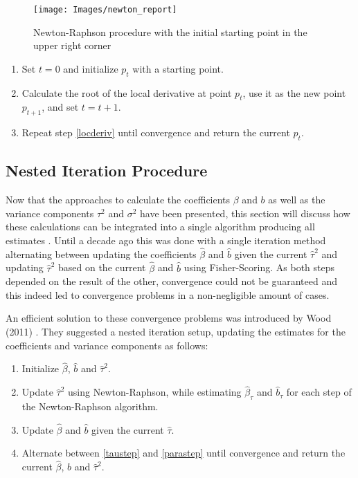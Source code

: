 \documentclass[12pt]{article}
\begin{document}
\begin{figure}[t]
\begin{center}
\texttt{[image: Images/newton\_report]}
\end{center}
\vspace{-2em}
\caption[caption]{Newton-Raphson procedure with the initial starting point in the upper right corner}\label{newton}
\end{figure}

\begin{enumerate}
\item Set $t=0$ and initialize $p_t$ with a starting point.
\item Calculate the root of the local derivative at point $p_{t}$,  use it as the new point $p_{t+1}$, and set $t=t+1$. \label{locderiv}
\item Repeat step \ref{locderiv} until convergence and return the current $p_t$.
\end{enumerate}



\subsection{Nested Iteration Procedure}\label{nested}

Now that the approaches to calculate the coefficients $\beta$ and $b$ as well as the variance components $\tau^2$ and $\sigma^2$ have been presented, this section will discuss how these calculations can be integrated into a single algorithm producing all estimates \cite{wood2011fast}. Until a decade ago this was done with a single iteration method alternating between updating the coefficients $\hat{\beta}$ and $\hat{b}$ given the current $\hat{\tau}^2$ and updating $\hat{\tau}^2$ based on the current $\hat{\beta}$ and $\hat{b}$ using Fisher-Scoring. As both steps depended on the result of the other, convergence could not be guaranteed and this indeed led to convergence problems in a non-negligible amount of cases.

An efficient solution to these convergence problems was introduced by Wood (2011) \cite{wood2011fast}. They suggested a nested iteration setup, updating the estimates for the coefficients and variance components as follows:



\begin{enumerate}
\item Initialize $\hat{\beta}$, $\hat{b}$ and $\hat{\tau}^2$.
\item Update $\hat{\tau}^2$ using Newton-Raphson, while estimating $\hat{\beta}_{\tau}$ and $\hat{b}_\tau$ for each step of the Newton-Raphson algorithm. \label{taustep}
\item Update $\hat{\beta}$ and $\hat{b}$ given the current $\hat{\tau}$.\label{parastep}
\item Alternate between \ref{taustep} and \ref{parastep} until convergence and return the current $\hat{\beta}$, $\hat{b}$ and $\hat{\tau}^2$.
\end{enumerate}
\end{document}
